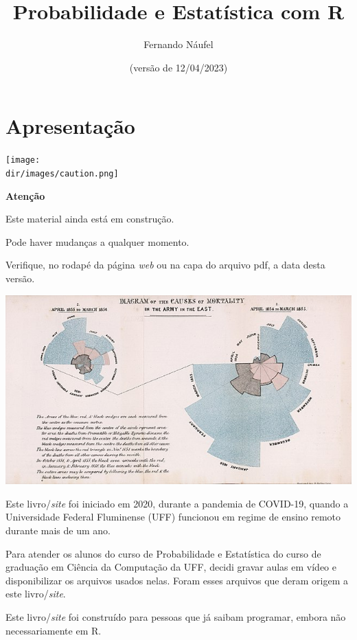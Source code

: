 \documentclass[
  11pt]{report}
\title{Probabilidade e Estatística com R}
\author{Fernando Náufel}
\date{(versão de 12/04/2023)}
\newcommand{\dir}{/ssd/R/x86_64-pc-linux-gnu-library/4.2/fnaufelRmd/rmarkdown/resources}
\newenvironment{rmdcaution}
{
  \begin{mycaution}
    \texttt{[image: \\dir/images/caution.png]}
    \tcblower
  }
  {
  \end{mycaution}
}
\begin{document}
\maketitle

{
\setcounter{tocdepth}{1}
\tableofcontents
}
\hypertarget{apresentacao}{%
\chapter*{Apresentação}\label{apresentacao}}

\begin{rmdcaution}
\textbf{Atenção}

Este material ainda está em construção.

Pode haver mudanças a qualquer momento.

Verifique, no rodapé da página \emph{web} ou na capa do arquivo pdf, a data desta versão.

\end{rmdcaution}

\newpage

\includegraphics{images/640px-Nightingale-mortality.jpg}

\vspace{2cm}

Este livro/\emph{site} foi iniciado em 2020, durante a pandemia de COVID-19, quando a Universidade Federal Fluminense (UFF) funcionou em regime de ensino remoto durante mais de um ano.

Para atender os alunos do curso de Probabilidade e Estatística do curso de graduação em Ciência da Computação da UFF, decidi gravar aulas em vídeo e disponibilizar os arquivos usados nelas. Foram esses arquivos que deram origem a este livro/\emph{site}.

Este livro/\emph{site} foi construído para pessoas que já saibam programar, embora não necessariamente em R.
\end{document}
